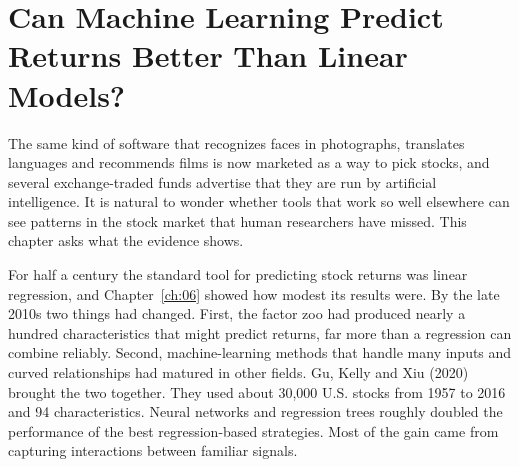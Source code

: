 \makeatletter
{}
\makeatother

\makeatletter
\makeatother

\chapter{Can Machine Learning Predict Returns Better Than Linear Models?}
\label{ch:20}
\providecommand{\term}[1]{\emph{#1}}

The same kind of software that recognizes faces in photographs, translates languages and recommends films is now marketed as a way to pick stocks, and several exchange-traded funds advertise that they are run by artificial intelligence. It is natural to wonder whether tools that work so well elsewhere can see patterns in the stock market that human researchers have missed. This chapter asks what the evidence shows.

For half a century the standard tool for predicting stock returns was linear regression, and Chapter~\ref{ch:06} showed how modest its results were. By the late 2010s two things had changed. First, the factor zoo had produced nearly a hundred characteristics that might predict returns, far more than a regression can combine reliably. Second, machine-learning methods that handle many inputs and curved relationships had matured in other fields. Gu, Kelly and Xiu (2020) brought the two together. They used about 30,000 U.S. stocks from 1957 to 2016 and 94 characteristics. Neural networks and regression trees roughly doubled the performance of the best regression-based strategies. Most of the gain came from capturing interactions between familiar signals.

